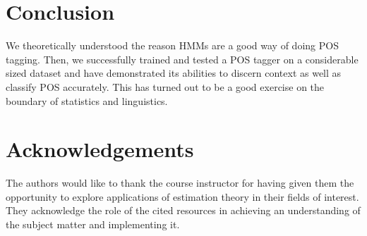 \documentclass[11pt]{article}
\begin{document}
\section{Conclusion}
We theoretically understood the reason HMMs are a good way of doing POS tagging. Then, we successfully trained and tested a POS tagger on a considerable sized dataset and have demonstrated its abilities to discern context as well as classify POS accurately. This has turned out to be a good exercise on the boundary of statistics and linguistics.

\section{Acknowledgements}
The authors would like to thank the course instructor for having given them the opportunity to explore applications of estimation theory in their fields of interest. They acknowledge the role of the cited resources in achieving an understanding of the subject matter and implementing it.



\end{document}
